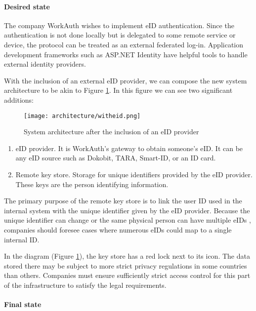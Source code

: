 \paragraph{Desired state}

The company WorkAuth wishes to implement eID authentication. Since the authentication is not done locally but is delegated to some remote service or device, the protocol can be treated as an external federated log-in. Application development frameworks such as ASP.NET Identity have helpful tools to handle external identity providers.

With the inclusion of an external eID provider, we can compose the new system architecture to be akin to Figure \ref{fig:sys-highlevel-witheid}. In this figure we can see two significant additions:

\begin{figure}
  \centering
  \texttt{[image: architecture/witheid.png]}
  \caption{System architecture after the inclusion of an eID provider}
  \label{fig:sys-highlevel-witheid}
\end{figure}

\begin{enumerate}
  \item {eID provider}. It is WorkAuth's gateway to obtain someone's eID. It can be any eID source such as Dokobit, TARA, Smart-ID, or an ID card.
  \item {Remote key store}. Storage for unique identifiers provided by the eID provider. These keys are the person identifying information.
\end{enumerate}

The primary purpose of the remote key store is to link the user ID used in the internal system with the unique identifier given by the eID provider. Because the unique identifier can change or the same physical person can have multiple eIDs \cite{eidas-saml}, companies should foresee cases where numerous eIDs could map to a single internal ID.

In the diagram (Figure \ref{fig:sys-highlevel-witheid}), the key store has a red lock next to its icon. The data stored there may be subject to more strict privacy regulations in some countries than others. Companies must ensure sufficiently strict access control for this part of the infrastructure to satisfy the legal requirements.

\paragraph{Final state}

